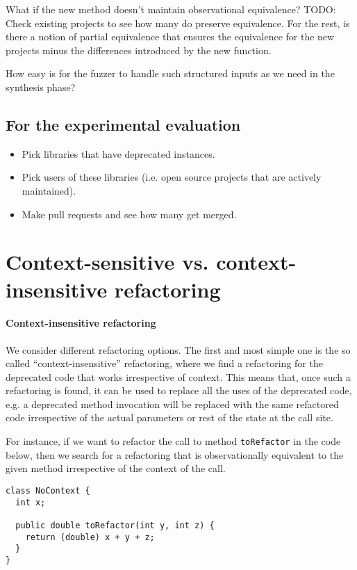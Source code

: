 \documentclass[runningheads,a4paper]{llncs}
\begin{document}
What if the new method doesn't maintain observational equivalence?
TODO: Check existing projects to see how many do preserve equivalence.
For the rest, is there a notion of partial equivalence that ensures the equivalence
for the new projects minus the differences introduced by the new function.

How easy is for the fuzzer to handle such structured inputs as we need in the
synthesis phase?


\subsection{For the experimental evaluation}
\begin{itemize}
\item Pick libraries that have deprecated instances.
\item Pick users of these libraries (i.e. open source projects that are actively maintained).
\item Make pull requests and see how many get merged.
\end{itemize}  

\section{Context-sensitive vs. context-insensitive refactoring}

\paragraph{Context-insensitive refactoring}
We consider different refactoring options. The first and most simple
one is the so called ``context-insensitive'' refactoring, where we
find a refactoring for the deprecated code that works irrespective of
context. This means that, once such a refactoring is found, it can be
used to replace all the uses of the deprecated code, e.g. a deprecated
method invocation will be replaced with the same refactored code
irrespective of the actual parameters or rest of the state at the call
site.

For instance, if we want to refactor the call to method
\texttt{toRefactor} in the code below, then we search for a refactoring that is
observationally equivalent to the given method irrespective of the
context of the call.

\begin{lstlisting}[mathescape=true]
class NoContext {
  int x;

  public double toRefactor(int y, int z) {
    return (double) x + y + z;
  }
}
\end{lstlisting}
 
\end{document}

